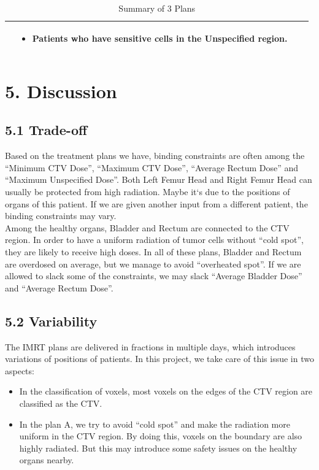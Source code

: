 \documentclass{report}
\begin{document}
\begin{table}[H]
\begin{tabular}{| m{2cm} | m{4cm} | m{4cm} | m{4cm} |}
\begin{itemize}
        \end{itemize} & 
        \begin{itemize} 
            \item Patients who have sensitive cells in the Unspecified region.  
        \end{itemize} \\
        \hline
        
    \end{tabular}
\caption{Summary of 3 Plans}
\label{table:4}
\end{table}


\section{5. Discussion}

\subsection{5.1 Trade-off}
Based on the treatment plans we have, binding constraints are often among the ``Minimum CTV Dose'', ``Maximum CTV Dose'', ``Average Rectum Dose'' and ``Maximum Unspecified Dose''. Both Left Femur Head and Right Femur Head can usually be protected from high radiation. Maybe it`s due to the positions of organs of this patient. If we are given another input from a different patient, the binding constraints may vary. \\

Among the healthy organs, Bladder and Rectum are connected to the CTV region. In order to have a uniform radiation of tumor cells without ``cold spot'', they are likely to receive high doses. In all of these plans, Bladder and Rectum are overdosed on average, but we manage to avoid ``overheated spot''. If we are allowed to slack some of the constraints, we may slack ``Average Bladder Dose'' and ``Average Rectum Dose''.

\subsection{5.2 Variability}
The IMRT plans are delivered in fractions in multiple days, which introduces variations of positions of patients. In this project, we take care of this issue in two aspects:
\begin{itemize}
    \item In the classification of voxels, most voxels on the edges of the CTV region are classified as the CTV.
    \item In the plan A, we try to avoid ``cold spot'' and make the radiation more uniform in the CTV region. By doing this, voxels on the boundary are also highly radiated. But this may introduce some safety issues on the healthy organs nearby.
\end{itemize}
\end{document}
